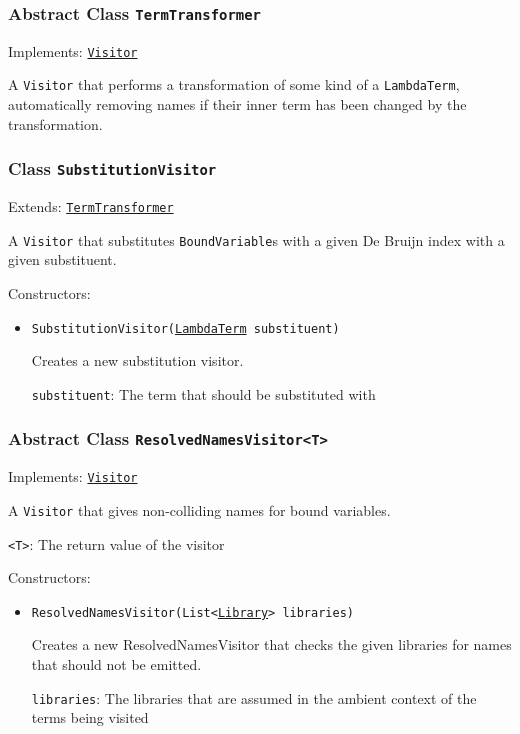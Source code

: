 \subsubsection{Abstract Class \texttt{TermTransformer}}
\label{type:edu.kit.wavelength.client.model.term.TermTransformer}
Implements: \texttt{\hyperref[type:edu.kit.wavelength.client.model.term.Visitor]{Visitor}}

A \texttt{Visitor} that performs a transformation of some kind of a
 \texttt{LambdaTerm}, automatically removing names if their inner term has been
 changed by the transformation.

\subsubsection{Class \texttt{SubstitutionVisitor}}
\label{type:edu.kit.wavelength.client.model.term.SubstitutionVisitor}
Extends: \texttt{\hyperref[type:edu.kit.wavelength.client.model.term.TermTransformer]{TermTransformer}}

A \texttt{Visitor} that substitutes \texttt{BoundVariable}s with a given De
 Bruijn index with a given substituent.

Constructors:
\begin{itemize}
\item \texttt{SubstitutionVisitor(\hyperref[type:edu.kit.wavelength.client.model.term.LambdaTerm]{LambdaTerm} substituent)}

Creates a new substitution visitor.

\texttt{substituent}: The term that should be substituted with

\end{itemize}

\subsubsection{Abstract Class \texttt{ResolvedNamesVisitor<T>}}
\label{type:edu.kit.wavelength.client.model.term.ResolvedNamesVisitor}
Implements: \texttt{\hyperref[type:edu.kit.wavelength.client.model.term.Visitor]{Visitor}}

A \texttt{Visitor} that gives non-colliding names for bound variables.

\texttt{<T>}: The return value of the visitor

Constructors:
\begin{itemize}
\item \texttt{ResolvedNamesVisitor(List<\hyperref[type:edu.kit.wavelength.client.model.library.Library]{Library}> libraries)}

Creates a new ResolvedNamesVisitor that checks the given libraries for names
 that should not be emitted.

\texttt{libraries}: The libraries that are assumed in the ambient context of the terms
            being visited

\end{itemize}

